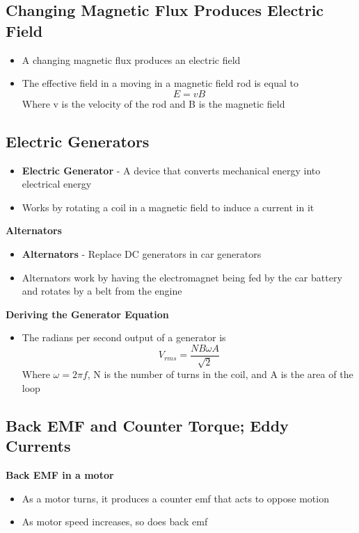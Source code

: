 \subsection{Changing Magnetic Flux Produces Electric Field}
\begin{itemize}
    \item A changing magnetic flux produces an electric field
    \item The effective field in a moving in a magnetic field rod is equal to \[E=vB\] Where v is the velocity of the rod and B is the magnetic field
\end{itemize}

\subsection{Electric Generators}
\begin{itemize}
    \item \textbf{Electric Generator} - A device that converts mechanical energy into electrical energy
    \item Works by rotating a coil in a magnetic field to induce a current in it
\end{itemize}

\textbf{Alternators}
\begin{itemize}
    \item \textbf{Alternators} - Replace DC generators in car generators
    \item Alternators work by having the electromagnet being fed by the car battery and rotates by a belt from the engine
\end{itemize}

\textbf{Deriving the Generator Equation}
\begin{itemize}
    \item The radians per second output of a generator is \[V_{rms}=\frac{NB\omega A}{\sqrt{2}}\] Where \(\omega=2\pi f\), N is the number of turns in the coil, and A is the area of the loop
\end{itemize}

\subsection{Back EMF and Counter Torque; Eddy Currents}
\textbf{Back EMF in a motor}
\begin{itemize}
    \item As a motor turns, it produces a counter emf that acts to oppose motion 
    \item As motor speed increases, so does back emf
\end{itemize}

